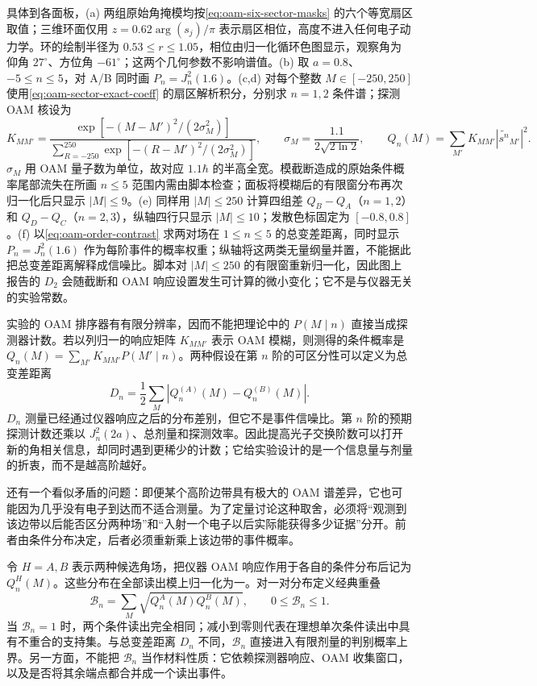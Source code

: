 具体到各面板，(a) 两组原始角掩模均按\cref{eq:oam-six-sector-masks} 的六个等宽扇区取值；三维环面仅用 $z=0.62\arg(s_j)/\pi$ 表示扇区相位，高度不进入任何电子动力学。环的绘制半径为 $0.53\le r\le1.05$，相位由归一化循环色图显示，观察角为仰角 $27^\circ$、方位角 $-61^\circ$；这两个几何参数不影响谱值。(b) 取 $a=0.8$、$-5\le n\le5$，对 A/B 同时画 $P_n=J_n^2(1.6)$。(c,d) 对每个整数 $M\in[-250,250]$ 使用\cref{eq:oam-sector-exact-coeff} 的扇区解析积分，分别求 $n=1,2$ 条件谱；探测 OAM 核设为
\[
 K_{MM'}=\frac{\exp[-(M-M')^2/(2\sigma_M^2)]}
 {\sum_{R=-250}^{250}\exp[-(R-M')^2/(2\sigma_M^2)]},\qquad
 \sigma_M=\frac{1.1}{2\sqrt{2\ln2}},\qquad
 Q_n(M)=\sum_{M'}K_{MM'}|\widetilde{s^n}_{M'}|^2.
\]
$\sigma_M$ 用 OAM 量子数为单位，故对应 $1.1\hbar$ 的半高全宽。模截断造成的原始条件概率尾部流失在所画 $n\le5$ 范围内需由脚本检查；面板将模糊后的有限窗分布再次归一化后只显示 $|M|\le9$。(e) 同样用 $|M|\le250$ 计算四组差 $Q_B-Q_A$（$n=1,2$）和 $Q_D-Q_C$（$n=2,3$），纵轴四行只显示 $|M|\le10$；发散色标固定为 $[-0.8,0.8]$。(f) 以\cref{eq:oam-order-contrast} 求两对场在 $1\le n\le5$ 的总变差距离，同时显示 $P_n=J_n^2(1.6)$ 作为每阶事件的概率权重；纵轴将这两类无量纲量并置，不能据此把总变差距离解释成信噪比。脚本对 $|M|\le250$ 的有限窗重新归一化，因此图上报告的 $D_2$ 会随截断和 OAM 响应设置发生可计算的微小变化；它不是与仪器无关的实验常数。


实验的 OAM 排序器有有限分辨率，因而不能把理论中的 $P(M\mid n)$ 直接当成探测器计数。若以列归一的响应矩阵 $K_{MM'}$ 表示 OAM 模糊，则测得的条件概率是 $Q_n(M)=\sum_{M'}K_{MM'}P(M'\mid n)$。两种假设在第 $n$ 阶的可区分性可以定义为总变差距离
\begin{equation}
 D_n=\frac12\sum_M|Q_n^{(A)}(M)-Q_n^{(B)}(M)|.
 \label{eq:oam-order-contrast}
\end{equation}
$D_n$ 测量已经通过仪器响应之后的分布差别，但它不是事件信噪比。第 $n$ 阶的预期探测计数还乘以 $J_n^2(2a)$、总剂量和探测效率。因此提高光子交换阶数可以打开新的角相关信息，却同时遇到更稀少的计数；它给实验设计的是一个信息量与剂量的折衷，而不是越高阶越好。


还有一个看似矛盾的问题：即便某个高阶边带具有极大的 OAM 谱差异，它也可能因为几乎没有电子到达而不适合测量。为了定量讨论这种取舍，必须将“观测到该边带以后能否区分两种场”和“入射一个电子以后实际能获得多少证据”分开。前者由条件分布决定，后者必须重新乘上该边带的事件概率。

令 $H=A,B$ 表示两种候选角场，把仪器 OAM 响应作用于各自的条件分布后记为 $Q_n^H(M)$。这些分布在全部读出模上归一化为一。对一对分布定义经典重叠
\begin{equation}
 \mathcal B_n=\sum_M\sqrt{Q_n^A(M)Q_n^B(M)},
 \qquad 0\leq\mathcal B_n\leq1.
 \label{eq:oam-bhattacharyya-overlap}
\end{equation}
当 $\mathcal B_n=1$ 时，两个条件读出完全相同；减小到零则代表在理想单次条件读出中具有不重合的支持集。与总变差距离 $D_n$ 不同，$\mathcal B_n$ 直接进入有限剂量的判别概率上界。另一方面，不能把 $\mathcal B_n$ 当作材料性质：它依赖探测器响应、OAM 收集窗口，以及是否将其余端点都合并成一个读出事件。

